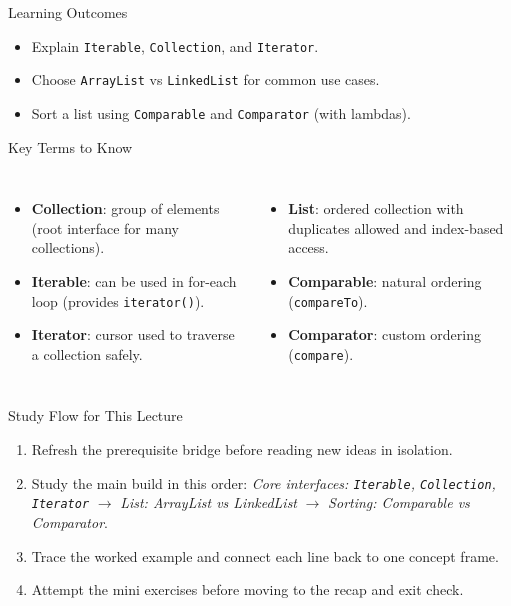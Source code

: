 \documentclass{beamer}
\begin{document}
\begin{frame}{Learning Outcomes}
  \begin{itemize}[<+->]
    \item Explain \texttt{Iterable}, \texttt{Collection}, and \texttt{Iterator}.
    \item Choose \texttt{ArrayList} vs \texttt{LinkedList} for common use cases.
    \item Sort a list using \texttt{Comparable} and \texttt{Comparator} (with lambdas).
  \end{itemize}
  \slidesources{\OOPSUnitVSources}
\end{frame}

\begin{frame}{Key Terms to Know}
\small
\begin{columns}[t]
\begin{itemize}
  \item \textbf{Collection}: group of elements (root interface for many collections).
  \item \textbf{Iterable}: can be used in for-each loop (provides \texttt{iterator()}).
  \item \textbf{Iterator}: cursor used to traverse a collection safely.
\end{itemize}
\begin{itemize}
  \item \textbf{List}: ordered collection with duplicates allowed and index-based access.
  \item \textbf{Comparable}: natural ordering (\texttt{compareTo}).
  \item \textbf{Comparator}: custom ordering (\texttt{compare}).
\end{itemize}
\end{columns}
  \slidesources{\OOPSUnitVSources}
\end{frame}

\begin{frame}{Study Flow for This Lecture}
\begin{enumerate}[<+->]
  \item Refresh the prerequisite bridge before reading new ideas in isolation.
  \item Study the main build in this order: \textit{Core interfaces: \texttt{Iterable}, \texttt{Collection}, \texttt{Iterator}} $\rightarrow$ \textit{List: ArrayList vs LinkedList} $\rightarrow$ \textit{Sorting: Comparable vs Comparator}.
  \item Trace the worked example and connect each line back to one concept frame.
  \item Attempt the mini exercises before moving to the recap and exit check.
\end{enumerate}
  \slidesources{\OOPSUnitVSources}
\end{frame}
\end{document}
